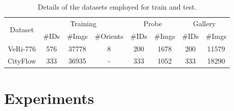 \documentclass[10pt,twocolumn,letterpaper]{article}
\begin{document}

\begin{table}
  \centering
  \begin{tabular}{c || c | c | c || c | c || c | c}
    \hline
    \multirow{2}{*}{Dataset} & \multicolumn{3}{c||}{Training} & \multicolumn{2}{c||}{Probe} & \multicolumn{2}{c}{Gallery} \\
    \cline{2-8}
    & \#IDs& \#Imgs & \#Orients & \#IDs & \#Imgs & \#IDs & \#Imgs \\
    \hline
    VeRi-776 \cite{liu2016veri}
    & 576 & 37778 & 8 & 200 & 1678 & 200 & 11579 \\
    CityFlow \cite{tang2019cityflow}
    & 333 & 36935 & - & 333 & 1052 & 333 & 18290 \\
    \hline
  \end{tabular}
  \caption{Details of the datasets employed for train and test.}
  \label{T:dataset_details}
\end{table}





\section{Experiments}
\end{document}

